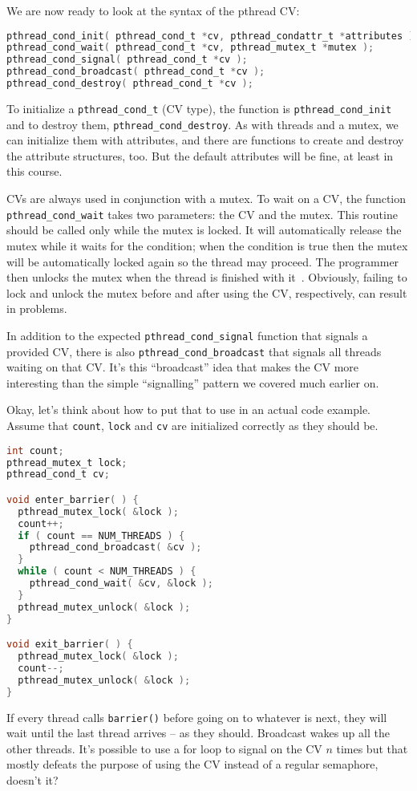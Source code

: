 We are now ready to look at the syntax of the pthread CV:

\begin{lstlisting}[language=C]
pthread_cond_init( pthread_cond_t *cv, pthread_condattr_t *attributes );
pthread_cond_wait( pthread_cond_t *cv, pthread_mutex_t *mutex );
pthread_cond_signal( pthread_cond_t *cv );
pthread_cond_broadcast( pthread_cond_t *cv );
pthread_cond_destroy( pthread_cond_t *cv );
\end{lstlisting}

To initialize a \texttt{pthread\_cond\_t} (CV type), the function is \texttt{pthread\_cond\_init} and to destroy them, \texttt{pthread\_cond\_destroy}. As with threads and a mutex, we can initialize them with attributes, and there are functions to create and destroy the attribute structures, too. But the default attributes will be fine, at least in this course.

CVs are always used in conjunction with a mutex. To wait on a CV, the function \texttt{pthread\_cond\_wait} takes two parameters: the CV and the mutex. This routine should be called only while the mutex is locked. It will automatically release the mutex while it waits for the condition; when the condition is true then the mutex will be automatically locked again so the thread may proceed. The programmer then unlocks the mutex when the thread is finished with it~\cite{pthreads}. Obviously, failing to lock and unlock the mutex before and after using the CV, respectively, can result in problems.

In addition to the expected \texttt{pthread\_cond\_signal} function that signals a provided CV, there is also \texttt{pthread\_cond\_broadcast} that signals all threads waiting on that CV. It's this ``broadcast'' idea that makes the CV more interesting than the simple ``signalling'' pattern we covered much earlier on.

Okay, let's think about how to put that to use in an actual code example. Assume that \texttt{count}, \texttt{lock} and \texttt{cv} are initialized correctly as they should be.

\newpage

\begin{lstlisting}[language=C]
int count;
pthread_mutex_t lock;
pthread_cond_t cv;

void enter_barrier( ) {
  pthread_mutex_lock( &lock );
  count++;
  if ( count == NUM_THREADS ) {
    pthread_cond_broadcast( &cv );
  }
  while ( count < NUM_THREADS ) {
    pthread_cond_wait( &cv, &lock );
  }
  pthread_mutex_unlock( &lock );
}

void exit_barrier( ) {
  pthread_mutex_lock( &lock );
  count--;
  pthread_mutex_unlock( &lock );
}
\end{lstlisting}

If every thread calls \texttt{barrier()} before going on to whatever is next, they will wait until the last thread arrives -- as they should. Broadcast wakes up all the other threads. It's possible to use a for loop to signal on the CV $n$ times but that mostly defeats the purpose of using the CV instead of a regular semaphore, doesn't it?



